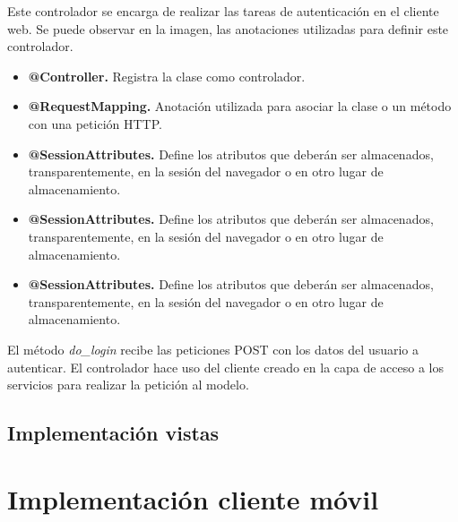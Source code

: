 Este controlador se encarga de realizar las tareas de autenticación en el cliente web. Se puede observar en la imagen, las anotaciones utilizadas para definir este controlador.

\begin{itemize}
	\item \textbf{@Controller. }Registra la clase como controlador.
	\item \textbf{@RequestMapping. }Anotación utilizada para asociar la clase o un método con una petición HTTP.
	\item \textbf{@SessionAttributes. }Define los atributos que deberán ser almacenados, transparentemente, en la sesión del navegador o en otro lugar de almacenamiento.
	\item \textbf{@SessionAttributes. }Define los atributos que deberán ser almacenados, transparentemente, en la sesión del navegador o en otro lugar de almacenamiento.
	\item \textbf{@SessionAttributes. }Define los atributos que deberán ser almacenados, transparentemente, en la sesión del navegador o en otro lugar de almacenamiento.
\end{itemize}

El método \textit{do_login} recibe las peticiones POST con los datos del usuario a autenticar. El controlador hace uso del cliente creado en la capa de acceso a los servicios para realizar la petición al modelo.


\subsection{Implementación vistas}

\section{Implementación cliente móvil}


















